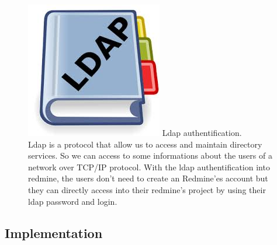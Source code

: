 	\begin{figure}[h]
		\includegraphics[scale=0.1]{Images/ldap.jpeg} 
		Ldap authentification. \\
		Ldap is a protocol that allow us to access and maintain directory services. So we can access to some informations about the users of a network over TCP/IP protocol. 
		With the ldap authentification into redmine, the users don't need to create an Redmine'es account but they can directly access into their redmine's project by using their ldap password and login.   
	\end{figure} 




\subsection{Implementation}

